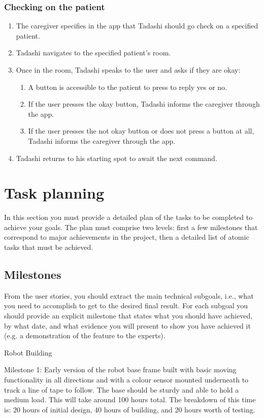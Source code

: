 \documentclass{article}
\begin{document}
\subsubsection{Checking on the patient}
\begin{enumerate}
\item The caregiver specifies in the app that Tadashi should go check on a specified patient. 
\item Tadashi navigates to the specified patient's room.
\item Once in the room, Tadashi speaks to the user and asks if they are okay:
  \begin{enumerate}
  \item A button is accessible to the patient to press to reply yes or no.
  \item If the user presses the okay button, Tadashi informs the caregiver through the app. 
  \item If the user presses the not okay button or does not press a button at all, Tadashi informs the caregiver through the app.
  \end{enumerate}
\item Tadashi returns to his starting spot to await the next command. 
\end{enumerate}

\section{Task planning}
In this section you must provide a detailed plan of the tasks to be completed to achieve your goals. The plan must comprise two levels: first a few milestones that correspond to major achievements in the project, then a detailed list of atomic tasks that must be achieved.

\subsection{Milestones} 
From the user stories, you should extract the main technical subgoals, i.e., what you need to accomplish to get to the desired final result. For each subgoal you should provide an explicit milestone that states what you should have achieved, by what date, and what evidence you will present to show you have achieved it (e.g. a demonstration of the feature to the experts).

Robot Building

Milestone 1: Early version of the robot base frame built with basic moving functionality in all directions and with a colour sensor mounted underneath to track a line of tape to follow. The base should be sturdy and able to hold a medium load. This will take around 100 hours total. The breakdown of this time is: 20 hours of initial design, 40 hours of building, and 20 hours worth of testing.
\end{document}
